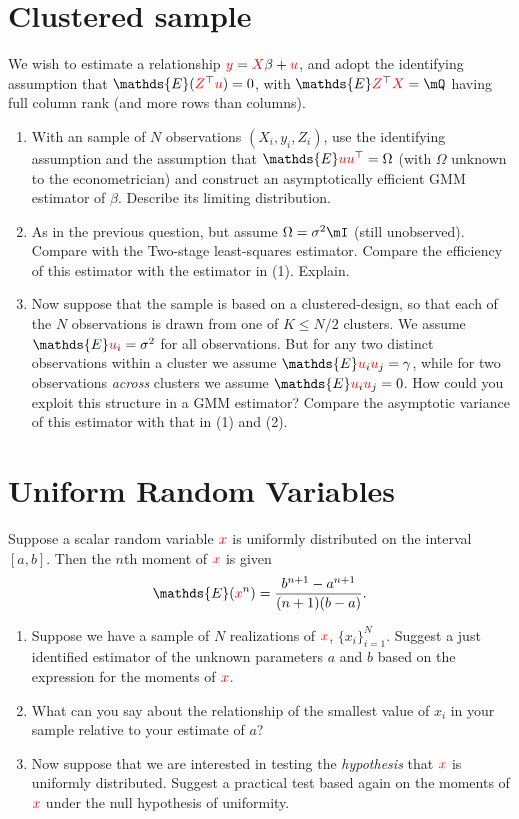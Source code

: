 \documentclass[12pt]{amsart}
\newcommand{\T}{\top}
\newcommand{\rv}[1]{\ensuremath{\textcolor{red}{#1}{}}}
\newcommand{\rvy}{\rv{y}}
\newcommand{\rvX}{\rv{X}}
\newcommand{\rvx}{\rv{x}}
\newcommand{\rvu}{\rv{u}}
\renewcommand{\E}{\ensuremath{\mathds{E}}}
\begin{document}
\section{Clustered sample}
\label{sec:orga33187f}
We wish to estimate a relationship \(\rvy = \rvX\beta + \rvu\), and
adopt the identifying assumption that \(\E(\rv{Z}^\T\rvu) = 0\), with
\(\E\rv{Z}^\T\rvX=\mQ\) having full column rank (and more rows than
columns).

\begin{enumerate}
\item With an sample of \(N\) observations \((X_i,y_i,Z_i)\), use the
identifying assumption and the assumption that \(\E
     \rvu\rvu^\T=\Omega\) (with \(\Omega\) unknown to the econometrician)
and construct an asymptotically efficient GMM estimator of
\(\beta\).  Describe its limiting distribution.
\item As in the previous question, but assume \(\Omega=\sigma^2\mI\)
(still unobserved).  Compare with the Two-stage least-squares
estimator.  Compare the efficiency of this estimator with the
estimator in (1).  Explain.
\item Now suppose that the sample is based on a clustered-design, so
that each of the \(N\) observations is drawn from one of \(K\leq
     N/2\) clusters.  We assume \(\E\rvu_i=\sigma^2\) for all
observations.  But for any two distinct observations within a
cluster we assume \(\E \rvu_i\rvu_j = \gamma\), while for two
observations \emph{across} clusters we assume \(\E \rvu_i\rvu_j = 0\).
How could you exploit this structure in a GMM estimator?  Compare
the asymptotic variance of this estimator with that in (1) and
(2).
\end{enumerate}

\section{Uniform Random Variables}
\label{sec:orgc20a2e4}
Suppose a scalar random variable \(\rvx\) is uniformly distributed on
the interval \([a,b]\).  Then the \(n\)th moment of \(\rvx\) is given
  \[
  \E(\rvx^{n})=\frac {b^{n+1}-a^{n+1}}{(n+1)(b-a)}.
  \]
\begin{enumerate}
\item Suppose we have a sample of \(N\) realizations of \rvx,
\(\{x_i\}_{i=1}^N\).  Suggest a just identified estimator of the
unknown parameters \(a\) and \(b\) based on the expression for the
moments of \rvx.
\item What can you say about the relationship of the smallest value of
\(x_i\) in your sample relative to your estimate of \(a\)?
\item Now suppose that we are interested in testing the \emph{hypothesis}
that \(\rvx\) is uniformly distributed.   Suggest a practical test
based again on the moments of \(\rvx\) under the null hypothesis of uniformity.
\end{enumerate}
\end{document}
